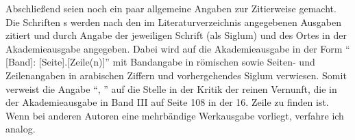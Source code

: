 Abschließend seien noch ein paar allgemeine Angaben zur Zitierweise gemacht.
Die Schriften s werden nach den im Literaturverzeichnis angegebenen
Ausgaben zitiert und durch Angabe der jeweiligen Schrift (als Siglum) und des
Ortes in der Akademieausgabe angegeben. Dabei wird auf die Akademieausgabe
in der Form \enquote{\cite{Kant:GesammelteWerke1900ff.} [Band]:
[Seite].[Zeile(n)]} mit Bandangabe in römischen sowie Seiten- und Zeilenangaben
in arabischen Ziffern und vorhergehendes Siglum verwiesen. Somit
verweist die Angabe \enquote{\cite{Kant:KritikderreinenVernunft2003},
\cite[][III: 108.16]{Kant:GesammelteWerke1900ff.}} auf die Stelle in der Kritik
der reinen Vernunft, die in der Akademieausgabe in Band III auf Seite 108 in der
16. Zeile zu finden ist. Wenn bei anderen Autoren eine mehrbändige Werkausgabe
vorliegt, verfahre ich analog.

